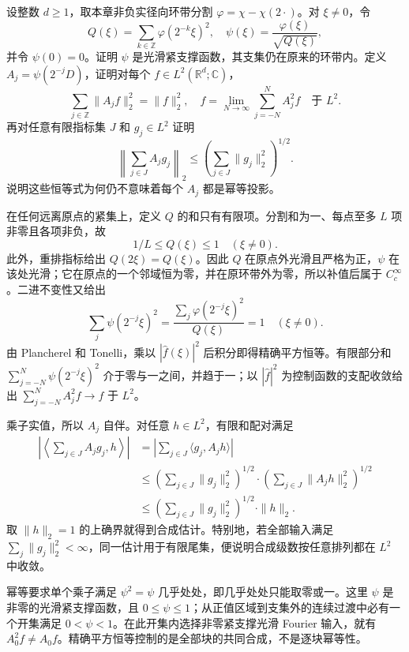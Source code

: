 \begin{exercise}\label{b2:ex:19-new-7}
设整数 \(d\geq1\)，取本章非负实径向环带分割 \(\varphi=\chi-\chi(2\cdot)\)。对 \(\xi\ne0\)，令
\[
 Q(\xi)=\sum_{k\in\mathbb Z}\varphi(2^{-k}\xi)^2,
 \quad \psi(\xi)=\frac{\varphi(\xi)}{\sqrt{Q(\xi)}},
\]
并令 \(\psi(0)=0\)。证明 \(\psi\) 是光滑紧支撑函数，其支集仍在原来的环带内。定义 \(A_j=\psi(2^{-j}D)\)，证明对每个 \(f\in L^2(\mathbb R^d;\mathbb C)\)，
\[
 \sum_{j\in\mathbb Z}\|A_jf\|_2^2=\|f\|_2^2,
 \quad f=\lim_{N\to\infty}\sum_{j=-N}^N A_j^2f
       \quad\text{于 }L^2.
\]
再对任意有限指标集 \(J\) 和 \(g_j\in L^2\) 证明
\[
 \left\|\sum_{j\in J}A_jg_j\right\|_2
 \leq\left(\sum_{j\in J}\|g_j\|_2^2\right)^{1/2}.
\]
说明这些恒等式为何仍不意味着每个 \(A_j\) 都是幂等投影。
\end{exercise}
\begin{solution}
在任何远离原点的紧集上，定义 \(Q\) 的和只有有限项。分割和为一、每点至多 \(L\) 项非零且各项非负，故
\[
 1/L\leq Q(\xi)\leq1\quad(\xi\ne0).
\]
此外，重排指标给出 \(Q(2\xi)=Q(\xi)\)。因此 \(Q\) 在原点外光滑且严格为正，\(\psi\) 在该处光滑；它在原点的一个邻域恒为零，并在原环带外为零，所以补值后属于 \(C_c^\infty\)。二进不变性又给出
\[
 \sum_j\psi(2^{-j}\xi)^2
 =\frac{\sum_j\varphi(2^{-j}\xi)^2}{Q(\xi)}=1
 \quad(\xi\ne0).
\]
由 Plancherel 和 Tonelli，乘以 \(|\widehat f(\xi)|^2\) 后积分即得精确平方恒等。有限部分和 \(\sum_{j=-N}^N\psi(2^{-j}\xi)^2\) 介于零与一之间，并趋于一；以 \(|\widehat f|^2\) 为控制函数的支配收敛给出 \(\sum_{j=-N}^N A_j^2f\to f\) 于 \(L^2\)。

乘子实值，所以 \(A_j\) 自伴。对任意 \(h\in L^2\)，有限和配对满足
\[
 \begin{aligned}
 \left|\left\langle\sum_{j\in J}A_jg_j,h\right\rangle\right|
 &=\left|\sum_{j\in J}\langle g_j,A_jh\rangle\right|\\
 &\leq\left(\sum_{j\in J}\|g_j\|_2^2\right)^{1/2}
       \cdot\left(\sum_{j\in J}\|A_jh\|_2^2\right)^{1/2}\\
 &\leq\left(\sum_{j\in J}\|g_j\|_2^2\right)^{1/2}\cdot\|h\|_2.
 \end{aligned}
\]
取 \(\|h\|_2=1\) 的上确界就得到合成估计。特别地，若全部输入满足 \(\sum_j\|g_j\|_2^2<\infty\)，同一估计用于有限尾集，便说明合成级数按任意排列都在 \(L^2\) 中收敛。

幂等要求单个乘子满足 \(\psi^2=\psi\) 几乎处处，即几乎处处只能取零或一。这里 \(\psi\) 是非零的光滑紧支撑函数，且 \(0\leq\psi\leq1\)；从正值区域到支集外的连续过渡中必有一个开集满足 \(0<\psi<1\)。在此开集内选择非零紧支撑光滑 Fourier 输入，就有 \(A_0^2f\ne A_0f\)。精确平方恒等控制的是全部块的共同合成，不是逐块幂等性。
\end{solution}

